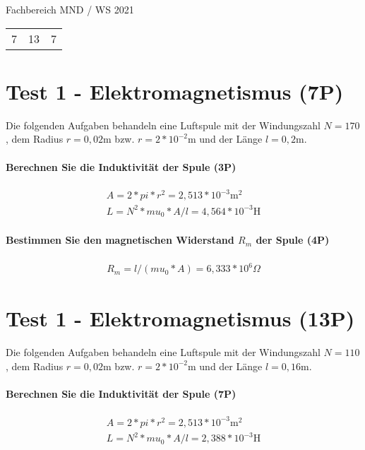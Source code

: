 \documentclass{article}
\begin{document}
Fachbereich MND / WS 2021

\begin{table}[]
\begin{tabular}{ lll }
7 & 13 & 7
\end{tabular}
\end{table}


\part*{Test 1 - Elektromagnetismus (7P)}

Die folgenden Aufgaben behandeln eine Luftspule mit der Windungszahl $N=170$, dem Radius $r=0{,}02$m bzw. $r=2*10^{ -2 }$m und der Länge $l=0{,}2$m.

\subsection*{Berechnen Sie die Induktivität der Spule (3P)}


\begin{gather}
A=2 * pi * r ^ 2=2{,}513*10^{-3}\text{m}^2 \\
L=N ^ 2 * mu_0 * A / l=4{,}564*10^{-3}\text{H}
\end{gather}

\subsection*{Bestimmen Sie den magnetischen Widerstand $R_{m}$ der Spule (4P)}


\begin{gather}
R_{m}=l / (mu_0 * A)=6{,}333*10^{6}\Omega
\end{gather}



\part*{Test 1 - Elektromagnetismus (13P)}

Die folgenden Aufgaben behandeln eine Luftspule mit der Windungszahl $N=110$, dem Radius $r=0{,}02$m bzw. $r=2*10^{ -2 }$m und der Länge $l=0{,}16$m.

\subsection*{Berechnen Sie die Induktivität der Spule (7P)}


\begin{gather}
A=2 * pi * r ^ 2=2{,}513*10^{-3}\text{m}^2 \\
L=N ^ 2 * mu_0 * A / l=2{,}388*10^{-3}\text{H}
\end{gather}
\end{document}
